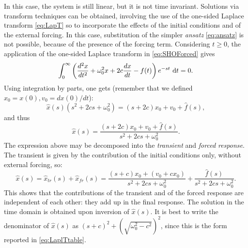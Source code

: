 In this case, the system is still linear, but it is not time invariant. Solutions via transform techniques can be obtained, involving the use of the one-sided Laplace transform \eqref{eq:LapT} so to incorporate the effects of the initial conditions and  of the external forcing. In this case, substitution of the simpler \emph{ansatz} \eqref{eq:ansatz} is not possible, because of the presence of the forcing term. Considering $t\geq 0$, the application of the one-sided Laplace transform in \eqref{eq:SHOForced} gives
\begin{equation}
    \int_0^{\infty} \left( \frac{d^2 x}{dt^2} + \omega_0^2 x + 2c \frac{dx}{dt} - f(t)\right)e^{-st} \, \mathop{}\!\mathrm{d} t = 0.
\end{equation}
Using integration by parts, one gets (remember that we defined $x_0 = x(0), v_0 = dx(0)/dt$):
\begin{equation}
    \hat x(s)\left( s^2 + 2cs + \omega_0^2\right) = (s+2c)x_0 + v_0 + \hat{f}(s),
\end{equation}
and thus
\begin{equation}
    \hat x(s) = \frac{(s+2c)x_0 + v_0 + \hat{f}(s)}{s^2 + 2cs + \omega_0^2}.
\end{equation}
The expression above may be decomposed into the \emph{transient} and \emph{forced response}. The transient is given by the contribution of the initial conditions only, without external forcing, so:
\begin{equation}
    \hat x(s) = \hat x_{tr}(s) + \hat x_{fr}(s) = \frac{(s+c)x_0 + (v_0 + cx_0)}{s^2 + 2cs + \omega_0^2} + \frac{\hat{f}(s)}{s^2 + 2cs + \omega_0^2}.
\end{equation}
This shows that the contributions of the transient and of the forced response are independent of each other: they add up in the final response. The solution in the time domain is obtained upon inversion of $\hat x(s).$  It is best to write the denominator of $\hat x(s)$ as $(s+c)^2 + \left(\sqrt{\omega_0^2-c^2}\right)^2$, since this is the form reported in \eqref{eq:LaplTtable}.
